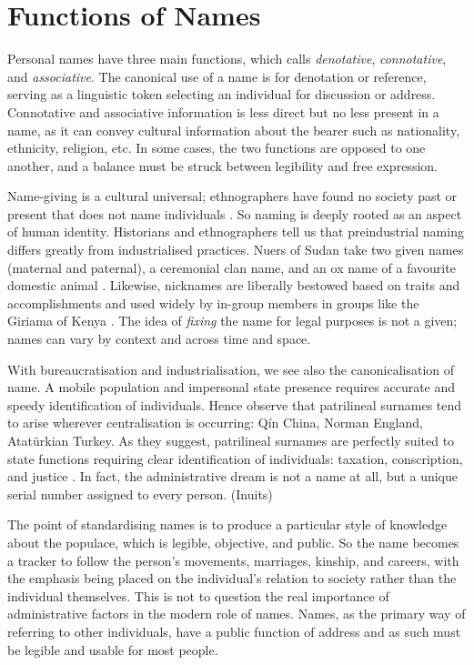 \section{Functions of Names}

Personal names have three main functions, which \textcite[392]{heymann11} calls \textit{denotative}, \textit{connotative}, and \textit{associative}. The canonical use of a name is for denotation or reference, serving as a linguistic token selecting an individual for discussion or address. Connotative and associative information is less direct but no less present in a name, as it can convey cultural information about the bearer such as nationality, ethnicity, religion, etc. In some cases, the two functions are opposed to one another, and a balance must be struck between legibility and free expression.

Name-giving is a cultural universal; ethnographers have found no society past or present that does not name individuals \parencite{alford87}. So naming is deeply rooted as an aspect of human identity. Historians and ethnographers tell us that preindustrial naming differs greatly from industrialised practices. Nuers of Sudan take two given names (maternal and paternal), a ceremonial clan name, and an ox name of a favourite domestic animal \parencite{wardhaugh92}. Likewise, nicknames are liberally bestowed based on traits and accomplishments and used widely by in-group members in groups like the Giriama of Kenya \parencite{parkin88} \parencite{wardhaugh92}. The idea of \textit{fixing} the name for legal purposes is not a given; names can vary by context and across time and space.

With bureaucratisation and industrialisation, we see also the canonicalisation of name. A mobile population and impersonal state presence requires accurate and speedy identification of individuals. Hence \textcite{scott02} observe that patrilineal surnames tend to arise wherever centralisation is occurring: Qín China, Norman England, Atatürkian Turkey. As they suggest, patrilineal surnames are perfectly suited to state functions requiring clear identification of individuals: taxation, conscription, and justice \parencite[18]{scott02}. In fact, the administrative dream is not a name at all, but a unique serial number assigned to every person. (Inuits)

The point of standardising names is to produce a particular style of knowledge about the populace, which is legible, objective, and public. So the name becomes a tracker to follow the person's movements, marriages, kinship, and careers, with the emphasis being placed on the individual's relation to society rather than the individual themselves. This is not to question the real importance of administrative factors in the modern role of names. Names, as the primary way of referring to other individuals, have a public function of address and as such must be legible and usable for most people.

